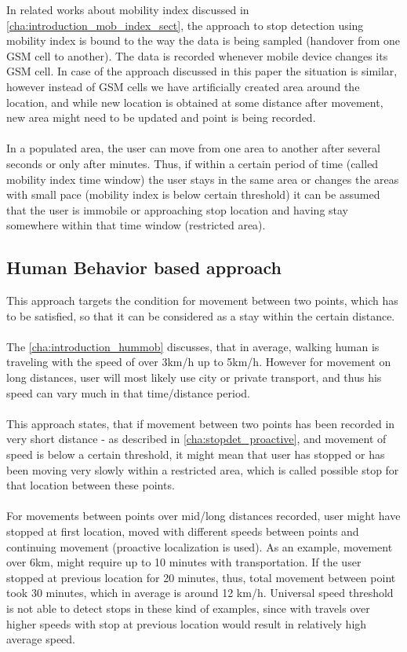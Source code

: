 In related works about mobility index discussed in \autoref{cha:introduction_mob_index_sect}, the approach to stop detection using mobility index is bound to the way the data is being sampled (handover from one GSM cell to another). The data is recorded whenever mobile device changes its GSM cell. In case of the approach discussed in this paper the situation is similar, however instead of GSM cells we have artificially created area around the location, and while new location is obtained at some distance after movement, new area might need to be updated and point is being recorded.
\\\\
In a populated area, the user can move from one area to another after several seconds or only after minutes. Thus, if within a certain
period of time (called mobility index time window) the user stays in the same area or changes the areas with small pace (mobility index is below certain threshold) it can be assumed that the user is immobile or approaching stop location and having stay somewhere within that time window (restricted area). 

\subsection{Human Behavior based approach}
\label{cha:stopdet_bh}

This approach targets the condition for movement between two points, which has to be satisfied, so that it can be considered as a stay within the certain distance. 
\\\\
The \autoref{cha:introduction_hummob} discusses, that in average, walking human is traveling with the speed of over 3km/h up to 5km/h. However for movement on long distances, user will most likely use city or private transport, and thus his speed can vary much in that time/distance period.
\\\\
This approach states, that if movement between two points has been recorded in very short distance - as described in \autoref{cha:stopdet_proactive}, and movement of speed is below a certain threshold, it might mean that user has stopped or has been moving very slowly within a restricted area, which is called possible stop for that location between these points. 
\\\\
For movements between points over mid/long distances recorded, user might have stopped at first location, moved with different speeds between points and continuing movement (proactive localization is used). As an example, movement over 6km, might require up to 10 minutes with transportation. If the user stopped at previous location for 20 minutes, thus, total movement between point took 30 minutes, which in average is around 12 km/h. Universal speed threshold is not able to detect stops in these kind of examples, since with travels over higher speeds with stop at previous location would result in relatively high average speed. 

